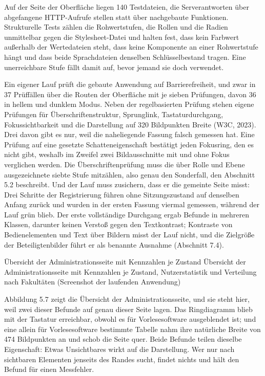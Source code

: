 Auf der Seite der Oberfläche liegen 140 Testdateien, die Serverantworten über abgefangene HTTP-Aufrufe stellen statt über nachgebaute Funktionen. Strukturelle Tests zählen die Rohwertstufen, die Rollen und die Radien unmittelbar gegen die Stylesheet-Datei und halten fest, dass kein Farbwert außerhalb der Wertedateien steht, dass keine Komponente an einer Rohwertstufe hängt und dass beide Sprachdateien denselben Schlüsselbestand tragen. Eine unerreichbare Stufe fällt damit auf, bevor jemand sie doch verwendet.

Ein eigener Lauf prüft die gebaute Anwendung auf Barrierefreiheit, und zwar in 37 Prüffällen über die Routen der Oberfläche mit je sieben Prüfungen, davon 36 in hellem und dunklem Modus. Neben der regelbasierten Prüfung stehen eigene Prüfungen für Überschriftenstruktur, Sprunglink, Tastaturdurchgang, Fokussichtbarkeit und die Darstellung auf 320 Bildpunkten Breite (W3C, 2023). Drei davon gibt es nur, weil die naheliegende Fassung falsch gemessen hat. Eine Prüfung auf eine gesetzte Schatteneigenschaft bestätigt jeden Fokusring, den es nicht gibt, weshalb im Zweifel zwei Bildausschnitte mit und ohne Fokus verglichen werden. Die Überschriftenprüfung muss die über Rolle und Ebene ausgezeichnete siebte Stufe mitzählen, also genau den Sonderfall, den Abschnitt 5.2 beschreibt. Und der Lauf muss zusichern, dass er die gemeinte Seite misst: Drei Schritte der Registrierung führen ohne Sitzungszustand auf denselben Anfang zurück und wurden in der ersten Fassung viermal gemessen, während der Lauf grün blieb. Der erste vollständige Durchgang ergab Befunde in mehreren Klassen, darunter keinen Verstoß gegen den Textkontrast; Kontraste von Bedienelementen und Text über Bildern misst der Lauf nicht, und die Zielgröße der Beteiligtenbilder führt er als benannte Ausnahme (Abschnitt 7.4).

%
{Übersicht der Administrationsseite mit Kennzahlen je Zustand}%
{Übersicht der Administrationsseite mit Kennzahlen je Zustand, Nutzerstatistik und Verteilung nach Fakultäten (Screenshot der laufenden Anwendung)}

Abbildung 5.7 zeigt die Übersicht der Administrationsseite, und sie steht hier, weil zwei dieser Befunde auf genau dieser Seite lagen. Das Ringdiagramm blieb mit der Tastatur erreichbar, obwohl es für Vorlesesoftware ausgeblendet ist; und eine allein für Vorlesesoftware bestimmte Tabelle nahm ihre natürliche Breite von 474 Bildpunkten an und schob die Seite quer. Beide Befunde teilen dieselbe Eigenschaft: Etwas Unsichtbares wirkt auf die Darstellung. Wer nur nach sichtbaren Elementen jenseits des Randes sucht, findet nichts und hält den Befund für einen Messfehler.

